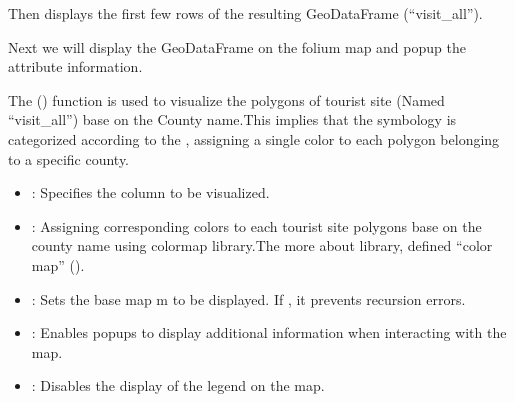 \documentclass[letterpaper,10pt,english]{sphinxmanual}
\begin{document}
\sphinxAtStartPar
Then displays the first few rows of the resulting GeoDataFrame (“visit\_all”).

\begin{sphinxVerbatim}[commandchars=\\\{\}]
  \PYG{p}{[}\PYG{p}{[}  \PYG{p}{]}\PYG{p}{]}
\end{sphinxVerbatim}

\sphinxAtStartPar
Next we will display the GeoDataFrame on the folium map and popup the attribute information.

\sphinxAtStartPar
The  () function is used to visualize the polygons of tourist site (Named “visit\_all”) base on the County name.This implies that the symbology is categorized according to the , assigning a single color to each polygon belonging to a specific county.
\begin{itemize}
\item {} 
\sphinxAtStartPar
{}: Specifies the column to be visualized.

\item {} 
\sphinxAtStartPar
{} : Assigning corresponding colors to each tourist site polygons base on the county name using  colormap library.The more about  library, defined “color map” ().

\item {} 
\sphinxAtStartPar
{}: Sets the base map m to be displayed. If , it prevents recursion errors.

\item {} 
\sphinxAtStartPar
{}: Enables popups to display additional information when interacting with the map.

\item {} 
\sphinxAtStartPar
{}: Disables the display of the legend on the map.

\end{itemize}
\end{document}
